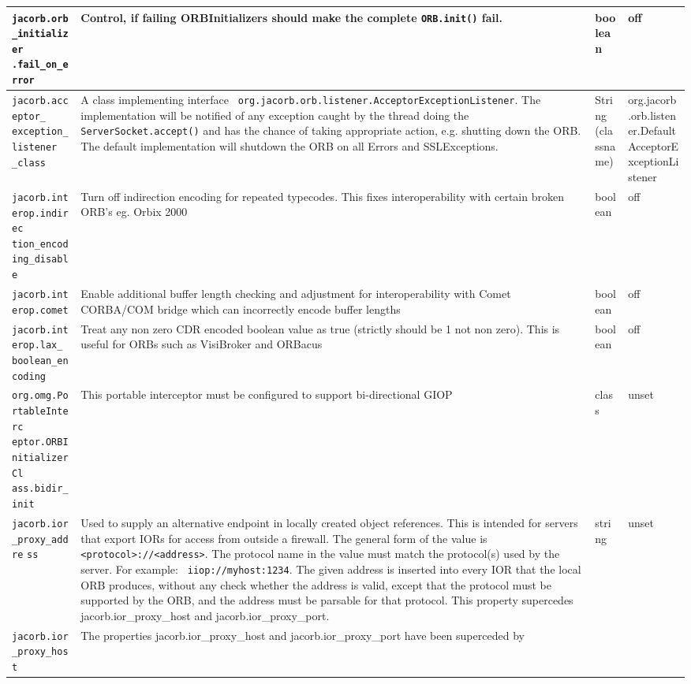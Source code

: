 {{\begin{small}
\begin{longtable}{|p{5cm}|p{7.5cm}|p{1.5cm}|p{1.5cm}|}
\hline
\verb"jacorb.orb_initializer"
\verb".fail_on_error" & Control, if failing ORBInitializers should make the
complete {\tt ORB.init()} fail. & boolean & off \\
\hline
\verb"jacorb.acceptor_"
\verb"exception_listener"
\verb"_class" & A class implementing interface {\tt
  org.jacorb.orb.listener.AcceptorException\-Listener}. The implementation
will be notified of any exception caught by the thread doing the {\tt
  ServerSocket.accept()} and has the chance of taking appropriate action,
e.g. shutting down the ORB. The default implementation will shutdown the ORB
on all Errors and SSLExceptions. & String (classname) & org.jacorb
.orb.listener.DefaultAcceptorExceptionListener \\
\hline
\verb"jacorb.interop.indirec"
\verb"tion_encoding_disable" & Turn off indirection encoding for
repeated typecodes. This fixes interoperability with certain broken
ORB's eg. Orbix 2000 & boolean & off \\
\hline
\verb"jacorb.interop.comet" & Enable additional buffer length checking
and adjustment for interoperability with Comet CORBA/COM bridge which
can incorrectly encode buffer lengths & boolean & off
\\
\hline
\verb"jacorb.interop.lax_"
\verb"boolean_encoding" & Treat any non zero CDR encoded boolean value
as true (strictly should be 1 not non zero). This is useful for ORBs such
as VisiBroker and ORBacus & boolean & off \\
\hline
\verb"org.omg.PortableInterc"
\verb"eptor.ORBInitializerCl"
\verb"ass.bidir_init" & This portable interceptor must be configured
to support bi-directional GIOP & class & unset \\
\hline
\verb"jacorb.ior_proxy_addre"
\verb"ss" & Used to supply an alternative
endpoint in locally created object
references. This is intended for servers that export IORs for access
from outside a firewall.  The general form of the value is {\tt
  <protocol>://<address>}. The protocol name in the value must match
the protocol(s) used by the server. For example: {\tt
  iiop://myhost:1234}. The given address is inserted into every IOR
that the local ORB produces, without any check whether the address is
valid, except that the protocol must be supported by the ORB, and the
address must be parsable for that protocol. This property supercedes
jacorb.ior\_proxy\_host and jacorb.ior\_proxy\_port.
& string & unset \\
\hline
\verb"jacorb.ior_proxy_host" & The properties jacorb.ior\_proxy\_host and
jacorb.ior\_proxy\_port have been superceded by

\end{longtable}
\end{small}}}
